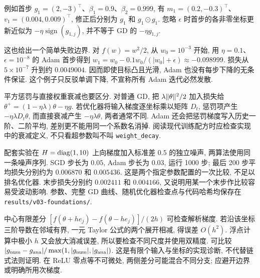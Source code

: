 例如首步 $g_1=(2,-3)^\top$、$\beta_1=0.9$、$\beta_2=0.999$, 有 $m_1=(0.2,-0.3)^\top$、$v_1=(0.004,0.009)^\top$, 修正后分别为 $g_1$ 和 $g_1\odot g_1$. 忽略 $\epsilon$ 时首步的各非零坐标更新近似为 $-\eta\operatorname{sign}(g_{1,j})$, 并不等于 GD 的 $-\eta g_{1,j}$.

这也给出一个简单失败边界. 对 $f(w)=w^2/2$, 从 $w_0=10^{-3}$ 开始, 用 $\eta=0.1$、$\epsilon=10^{-8}$ 的 Adam 首步得到 $w_1=w_0-0.1w_0/(|w_0|+\epsilon)\approx-0.098999$. 损失从 $5\times10^{-7}$ 升到约 $0.0049004$. 因而即使目标凸且光滑, Adam 也没有每步下降的无条件保证. 这个例子只反驳单调下降, 不宣称所有 Adam 迭代必然发散.

平方惩罚与直接权重衰减也要区分. 对普通 GD, 把 $\lambda\lVert \theta\rVert^2/2$ 加入损失给
$\theta^+=(1-\eta\lambda)\theta-\eta g$.
若优化器将输入梯度逐坐标乘以矩阵 $D_t$, 惩罚项产生 $-\eta\lambda D_t\theta$, 而直接衰减产生 $-\eta\lambda\theta$, 两者通常不同. Adam 还会把惩罚梯度写入历史一阶、二阶平均, 差别更不能用同一个系数名消掉. 阅读现代训练配方时应检查实现中的衰减定义, 不只看超参数叫不叫 \texttt{weight\_decay}.

配套实验在 $H=\operatorname{diag}(1,10)$ 上向梯度加入标准差 $0.5$ 的独立噪声, 两算法使用同一条噪声序列. SGD 步长为 $0.05$, Adam 步长为 $0.03$, 运行 1000 步; 最后 200 步平均损失分别约为 $0.006870$ 和 $0.005436$. 这是两个指定参数配置的一次比较, 不足以排名优化器. 末步损失分别约 $0.002411$ 和 $0.004166$, 又说明用某一个末步作比较容易受波动影响. 参数、完整 GD 曲线、随机优化器检查点与代码哈希均保存在 \texttt{results/v03-foundations/}.

中心有限差分 $[f(\theta+he_j)-f(\theta-he_j)]/(2h)$ 可检查解析梯度. 若沿该坐标三阶导数在邻域有界, 一元 Taylor 公式的两个展开相减, 得误差 $O(h^2)$. 浮点计算中极小 $h$ 又会放大消减误差, 所以要检查不同尺度并使用双精度. 可比较
$|g_{\rm num}-g_{\rm ana}|/\max(1,|g_{\rm num}|,|g_{\rm ana}|)$.
这是有限个输入与坐标的实现诊断, 不代替链式法则证明. 在 ReLU 零点等不可微处, 两侧差分可能混合不同分支; 应避开边界或明确所用次梯度.

